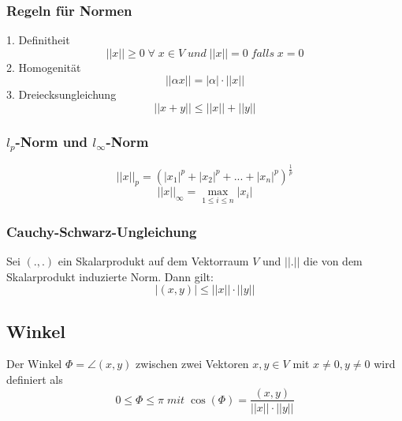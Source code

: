\documentclass[a4paper,twocolumn,10pt]{article}
\begin{document}
\subsubsection{Regeln für Normen}
1. Definitheit
\begin{equation*}
||x||\geq 0\;\forall\;x\in V\;und\;||x||=0\;falls\;x=0
\end{equation*}
2. Homogenität
\begin{equation*}
||\alpha x|| = |\alpha|\cdot ||x||
\end{equation*}
3. Dreiecksungleichung
\begin{equation*}
||x+y||\leq ||x||+||y||
\end{equation*}

\subsubsection{$l_p$-Norm und $l_\infty$-Norm}
\begin{equation*}
||x||_p=(|x_1|^p+|x_2|^p+...+|x_n|^p)^{\frac{1}{p}}
\end{equation*}
\begin{equation*}
||x||_\infty =\max\limits_{1\leq i\leq n}|x_i|
\end{equation*}

\subsubsection{Cauchy-Schwarz-Ungleichung}
Sei $(.,.)$ ein Skalarprodukt auf dem Vektorraum $V$ und $||.||$ die von dem Skalarprodukt induzierte Norm. Dann gilt:
\begin{equation*}
|(x,y)|\leq ||x||\cdot ||y||
\end{equation*}

\subsection{Winkel}
Der Winkel $\Phi = \angle (x,y)$ zwischen zwei Vektoren $x,y\in V$ mit $x\neq 0,y\neq 0$ wird definiert als
\begin{equation*}
0\leq\Phi\leq\pi\;mit\;\cos(\Phi)=\frac{(x,y)}{||x||\cdot ||y||}
\end{equation*}
\end{document}
